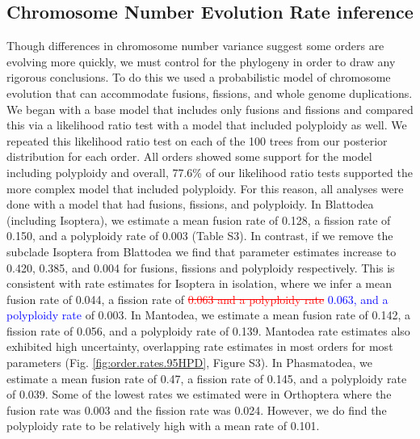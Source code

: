 \documentclass[]{rsos}%
\begin{document}
\subsection{Chromosome Number Evolution Rate inference}
Though differences in chromosome number variance suggest some orders are evolving more quickly, we must control for the phylogeny in order to draw any rigorous conclusions.
To do this we used a probabilistic model of chromosome evolution that can accommodate fusions, fissions, and whole genome duplications.
We began with a base model that includes only fusions and fissions and compared this via a likelihood ratio test with a model that included polyploidy as well.
We repeated this likelihood ratio test on each of the 100 trees from our posterior distribution for each order.
All orders showed some support for the model including polyploidy and overall, 77.6\% of our likelihood ratio tests supported the more complex model that included polyploidy.
For this reason, all analyses were done with a model that had fusions, fissions, and polyploidy.
In Blattodea (including Isoptera), we estimate a mean fusion rate of 0.128, a fission rate of 0.150, and a polyploidy rate of 0.003 (Table S3).
In contrast, if we remove the subclade Isoptera from Blattodea we find that parameter estimates increase to 0.420, 0.385, and 0.004 for fusions, fissions and polyploidy respectively.
This is consistent with rate estimates for Isoptera in isolation, where we infer
a mean fusion rate of 0.044, a fission rate of \textcolor{red}{\st{0.063 and a polyploidy rate}} \textcolor{blue}{0.063, and a polyploidy rate} of 0.003.
In Mantodea, we estimate a mean fusion rate of 0.142, a fission rate of 0.056, and a polyploidy rate of 0.139.
Mantodea rate estimates also exhibited high uncertainty, overlapping rate estimates in most orders for most parameters (Fig. \ref{fig:order.rates.95HPD}, Figure S3).
In Phasmatodea, we estimate a mean fusion rate of 0.47, a fission rate of 0.145, and a polyploidy rate of 0.039.
Some of the lowest rates we estimated were in Orthoptera where the fusion rate was 0.003 and the fission rate was 0.024. However, we do find the polyploidy rate to be relatively high with a mean rate of 0.101.

\end{document}
